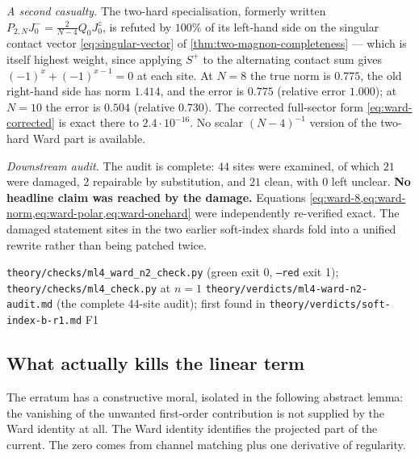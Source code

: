 \begin{refutedclaim}
\emph{A second casualty.} The two-hard specialisation, formerly written
$P_{2,N}J^-_0=\frac{2}{N-4}Q_0J^z_0$, is refuted by $100\%$ of its left-hand
side on the singular contact vector \cref{eq:singular-vector} of
\cref{thm:two-magnon-completeness} --- which is itself highest weight, since
applying $S^+$ to the alternating contact sum gives
$(-1)^x+(-1)^{x-1}=0$ at each site. At $N=8$ the true norm is $0.775$, the old
right-hand side has norm $1.414$, and the error is $0.775$ (relative error
$1.000$); at $N=10$ the error is $0.504$ (relative $0.730$). The corrected
full-sector form \cref{eq:ward-corrected} is exact there to
$2.4\cdot10^{-16}$. No scalar $(N-4)^{-1}$ version of the two-hard Ward part
is available.

\emph{Downstream audit.} The audit is complete: $44$ sites were examined, of
which $21$ were damaged, $2$ repairable by substitution, and $21$ clean, with
$0$ left unclear. \textbf{No headline claim was reached by the damage.}
Equations \cref{eq:ward-8,eq:ward-norm,eq:ward-polar,eq:ward-onehard} were
independently re-verified exact. The damaged statement sites in the two
earlier soft-index shards fold into a unified rewrite rather than being
patched twice.
\end{refutedclaim}
%
{\texttt{theory/checks/ml4\_ward\_n2\_check.py} (green exit 0, \texttt{--red}
exit 1); \texttt{theory/checks/ml4\_check.py} at $n=1$}%
{\texttt{theory/verdicts/ml4-ward-n2-audit.md} (the complete 44-site audit);
first found in \texttt{theory/verdicts/soft-index-b-r1.md} F1}

\subsection{What actually kills the linear term}

The erratum has a constructive moral, isolated in the following abstract
lemma: the vanishing of the unwanted first-order contribution is not supplied
by the Ward identity at all. The Ward identity identifies the projected part
of the current. The zero comes from channel matching plus one derivative of
regularity.

